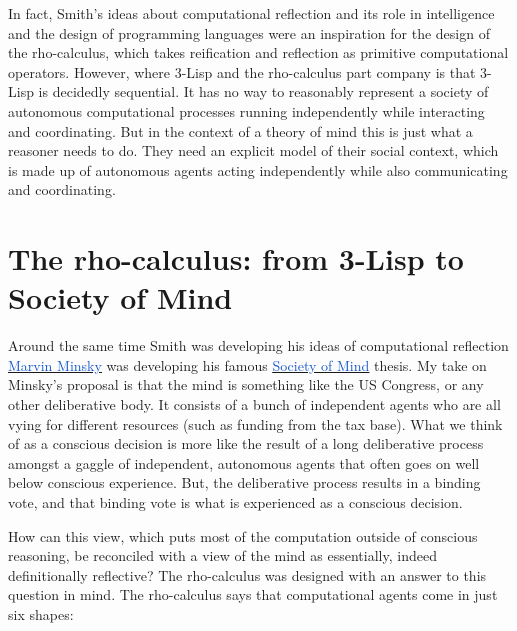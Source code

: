 \documentclass[runningheads]{llncs}
\begin{document}
\vspace{1\baselineskip}
In fact, Smith’s ideas about computational reflection and its role in intelligence and the design of programming languages were an inspiration for the design of the rho-calculus, which takes reification and reflection as primitive computational operators. However, where 3-Lisp and the rho-calculus part company is that 3-Lisp is decidedly sequential. It has no way to reasonably represent a society of autonomous computational processes running independently while interacting and coordinating. But in the context of a theory of mind this is just what a reasoner needs to do. They need an explicit model of their social context, which is made up of autonomous agents acting independently while also communicating and coordinating.

\vspace{1\baselineskip}
\section{The rho-calculus: from 3-Lisp to Society of Mind}

\vspace{1\baselineskip}
Around the same time Smith was developing his ideas of computational reflection \href{https://en.wikipedia.org/wiki/Marvin_Minsky}{\uline{\textcolor[HTML]{1155CC}{Marvin Minsky}}} was developing his famous \href{https://en.wikipedia.org/wiki/Society_of_Mind}{\uline{\textcolor[HTML]{1155CC}{Society of Mind}}} thesis. My take on Minsky’s proposal is that the mind is something like the US Congress, or any other deliberative body. It consists of a bunch of independent agents who are all vying for different resources (such as funding from the tax base). What we think of as a conscious decision is more like the result of a long deliberative process amongst a gaggle of independent, autonomous agents that often goes on well below conscious experience. But, the deliberative process results in a binding vote, and that binding vote is what is experienced as a conscious decision.



\vspace{1\baselineskip}
How can this view, which puts most of the computation outside of conscious reasoning, be reconciled with a view of the mind as essentially, indeed definitionally reflective? The rho-calculus was designed with an answer to this question in mind. The rho-calculus says that computational agents come in just six shapes:
\end{document}

